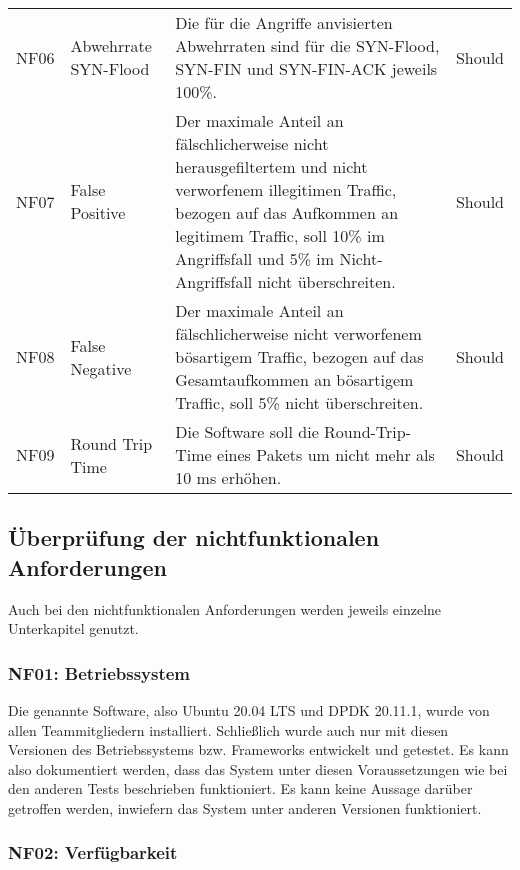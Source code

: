 \documentclass[../review_3.tex]{subfiles}
\begin{document}
\begin{longtable}[ht] { p{1cm} p{4cm} p{7cm} l }
    NF06        & Abwehrrate SYN-Flood & Die für die Angriffe anvisierten Abwehrraten sind für die SYN-Flood, SYN-FIN und SYN-FIN-ACK jeweils 100\%.                                                                                                                              & Should          \\
    NF07        & False Positive       & Der maximale Anteil an fälschlicherweise nicht herausgefiltertem und nicht verworfenem illegitimen Traffic, bezogen auf das Aufkommen an legitimem Traffic, soll 10\% im Angriffsfall und 5\% im Nicht-Angriffsfall nicht überschreiten. & Should          \\
    NF08        & False Negative       & Der maximale Anteil an fälschlicherweise nicht verworfenem bösartigem Traffic, bezogen auf das Gesamtaufkommen an bösartigem Traffic, soll 5\% nicht überschreiten.                                                                      & Should          \\
    NF09        & Round Trip Time      & Die Software soll die Round-Trip-Time eines Pakets um nicht mehr als 10 ms erhöhen. & Should                                                                                                                                                                       \\ \bottomrule
\end{longtable}

\subsection{Überprüfung der nichtfunktionalen Anforderungen}
Auch bei den nichtfunktionalen Anforderungen werden jeweils einzelne Unterkapitel genutzt.

\subsubsection{NF01: Betriebssystem}
Die genannte Software, also Ubuntu 20.04 LTS und DPDK 20.11.1, wurde von allen Teammitgliedern installiert. Schließlich wurde auch nur mit diesen Versionen des Betriebssystems bzw. Frameworks entwickelt und getestet. Es kann also dokumentiert werden, dass das System unter diesen Voraussetzungen wie bei den anderen Tests beschrieben funktioniert. Es kann keine Aussage darüber getroffen werden, inwiefern das System unter anderen Versionen funktioniert.

\subsubsection{NF02: Verfügbarkeit}
\end{document}
